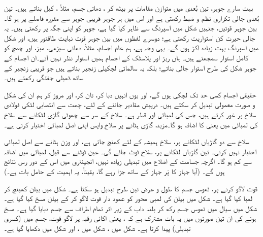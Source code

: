  
   بہت سارے جوہر، تین بُعدی میں متوازن  مقامات پر بیٹھ کر  ،    دھاتی جسم، مثلاً ، کیل بناتے ہیں۔ تین بُعدی جالی تکراری  نظم و ضبط رکھتی  ہے اور اس   میں ہر جوہر  قریبی جوہر سے   مقررہ فاصلے  پر  ہو گا۔ بین جوہر قوتیں،    جنہیں شکل   میں اسپرنگ سے ظاہر کیا گیا ہے، جوہر کو اپنی جگہ پر رکھتی ہیں۔ یہ جالی  حیرت کن   استواریت  رکھتی ہے؛ دوسرے لفظوں میں بین  جوہر  قوت نہایت طاقتور ہیں، اور شکل  میں اسپرنگ بہت زیادہ   اکڑ ہوں گے۔ یہی وجہ ہے، ہم عام اجسام، مثلاً، دھاتی سیڑھی، میز، اور چمچ  کو کامل استوار سمجھتے ہیں۔ ہاں  ربڑ اور پلاسٹک   کے اجسام  ہمیں استوار نظر نہیں آتے۔ان اجسام کے جوہر شکل  کی طرح  استوار جالی   بناتے؛  بلکہ   یہ سالماتی لچکیلی  زنجیر  بناتے ہیں جو قریبی زنجیر  کے ساتھ   ڈھیلی   جفتگی  رکھتے ہیں۔
   
   حقیقی  اجسام کسی حد تک لچکی ہوں گے، اور یوں انہیں دبا کر، تان کر، اور مروڑ کر ہم ان کی شکل و صورت معمولی تبدیل کر سکتے ہیں۔ درپیش مقادیر جاننے کے لئے، چھت سے انتصابی   لٹکی فولادی سلاخ پر غور کرتے ہیں، جس کی لمبائی  اور  قطر   ہے۔ سلاخ   کے سر سے چھوٹی گاڑی لٹکانے سے  سلاخ کی لمبائی میں  یعنی  کا اضافہ  ہو گا۔مزید، گاڑی   ہٹانے  پر سلاخ واپس اپنی اصل لمبائی اختیار کرتی ہے۔
   
سلاخ سے دو گاڑیاں لٹکانے پر، سلاخ ہمیشہ کے لئے  کھنچ   جاتی ہے، اور وزن ہٹانے سے اصل لمبائی اختیار نہیں کرتی۔ تین گاڑیاں لٹکانے  پر، سلاخ ٹوٹ جائے گی۔ عین ٹوٹنے سے قبل، لمبائی میں اضافہ  سے کم ہو گا۔ اگرچہ جسامت  کے اضلاع میں تبدیلی زیادہ نہیں، انجینئری میں اس کے دور رس نتائج ہوں گے۔ (آیا جہاز کا پَر جہاز کے ساتھ جڑا رہے گا، یقیناً، یہ  اہمیت کے حامل بات  ہے۔)

\quad
قوت لاگو کرنے پر،  ٹھوس جسم  کا  طول و عرض تین طرح تبدیل ہو سکتا ہے۔ شکل  میں  بیلن  کھینچ کر لمبا کیا گیا ہے۔ شکل  میں  بیلن کی لمبی محور  کو عمود دار قوت لاگو کر کے بیلن  مسخ کیا گیا ہے۔ شکل  میں  سیال میں ٹھوس جسم رکھ کر بلند داب کے زیر اثر تمام اطراف سے جسم دبایا گیا ہے۔  مسخ ہونے  کی ان تین صورتوں میں  یہ بات مشترک ہے کہ   ، یعنی اکائی رقبہ پر لاگو قوت، جسم میں  (کسری تبدیلی) پیدا کرتا  ہے۔ شکل    میں   ، شکل  میں ، اور شکل  میں  دکھایا گیا ہے۔

